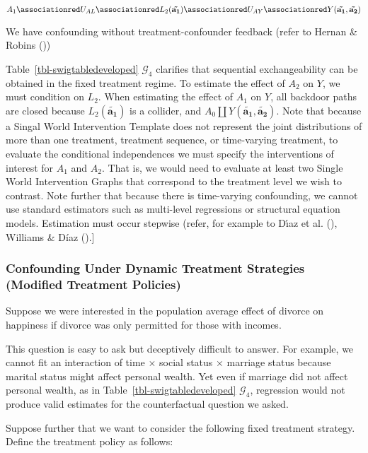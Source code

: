 \documentclass[
  single column]{article}
\begin{document}
\[
A_1 \associationred U_{AL} \associationred L_2({\mathbf{\tilde{a_1}}})  \associationred U_{AY} \associationred Y({\mathbf{\tilde{a_1}, \tilde{a_2}}})
\]

We have confounding without treatment-confounder feedback (refer to
Hernan \& Robins ())

Table~\ref{tbl-swigtabledeveloped} \(\mathcal{G}_4\) clarifies that
sequential exchangeability can be obtained in the fixed treatment
regime. To estimate the effect of \(A_2\) on \(Y\), we must condition on
\(L_2\). When estimating the effect of \(A_1\) on \(Y\), all backdoor
paths are closed because \(L_2({\mathbf{\tilde{a_1}}})\) is a collider,
and \(A_0 \coprod Y({\mathbf{\tilde{a_1}, \tilde{a_2}}})\). Note that
because a Singal World Intervention Template does not represent the
joint distributions of more than one treatment, treatment sequence, or
time-varying treatment, to evaluate the conditional independences we
must specify the interventions of interest for \(A_1\) and \(A_2\). That
is, we would need to evaluate at least two Single World Intervention
Graphs that correspond to the treatment level we wish to contrast. Note
further that because there is time-varying confounding, we cannot use
standard estimators such as multi-level regressions or structural
equation models. Estimation must occur stepwise (refer, for example to
Dı́az et al. (), Williams \&
Díaz ().{]}

\subsubsection{Confounding Under Dynamic Treatment Strategies (Modified
Treatment
Policies)}\label{confounding-under-dynamic-treatment-strategies-modified-treatment-policies}

Suppose we were interested in the population average effect of divorce
on happiness if divorce was only permitted for those with incomes.

This question is easy to ask but deceptively difficult to answer. For
example, we cannot fit an interaction of time \(\times\) social status
\(\times\) marriage status because marital status might affect personal
wealth. Yet even if marriage did not affect personal wealth, as in
Table~\ref{tbl-swigtabledeveloped} \(\mathcal{G}_4\), regression would
not produce valid estimates for the counterfactual question we asked.

Suppose further that we want to consider the following fixed treatment
strategy. Define the treatment policy as follows:
\end{document}
